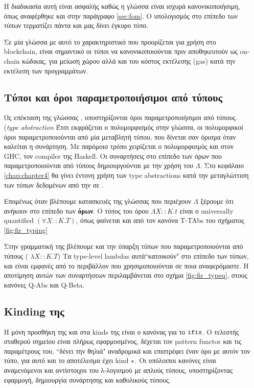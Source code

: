 Η διαδικασία αυτή είναι ασφαλής καθώς η γλώσσα \FOMF{} είναι ισχυρά κανονικοποιήσιμη, όπως αναφέρθηκε
και στην παράγραφο \ref{sec:fom}. Ο υπολογισμός στο επίπεδο των τύπων τερματίζει πάντα και μας δίνει
έγκυρο τύπο.

Σε μία γλώσσα με αυτό το χαρακτηριστικό που προορίζεται για χρήση στο blockchain, είναι σημαντικό
οι τύποι να κανονικοποιούνται πριν αποθηκευτούν ως on-chain κώδικας, για μείωση χώρου αλλά
και του κόστος εκτέλεσης (gas) κατά την εκτέλεση των προγραμμάτων.


\subsection{Τύποι και όροι παραμετροποιήσιμοι από τύπους}

Ως επέκταση της γλώσσας \FOM, υποστηρίζονται όροι παραμετροποιήσιμοι από τύπους.
(\emph{type abstraction}
Έτσι εκφράζεται ο πολυμορφισμός στην γλώσσα, οι πολυμορφικοί όροι παραμετροποιούνται
από μία μεταβλητή τύπου, που δίνεται σαν όρισμα όταν καλείται η συνάρτηση. Με παρόμοιο
τρόπο χειρίζεται ο πολυμορφισμός και στον GHC, τον compiler της Haskell. Οι συναρτήσεις
στο επίπεδο των όρων που παραμετροποιούνται από τύπους δημιουργούνται με την χρήση
του $\Lambda$. Στο κεφάλαιο \ref{chap:chapter4} θα γίνει έντονη χρήση των type abstractions
κατά την μεταγλώττιση των τύπων δεδομένων από την \FIR{} σε \FOMF{}.


Επομένως όταν
βλέπουμε κατασκευές της γλώσσας που περιέχουν $\Lambda$ ξέρουμε ότι ανήκουν
στο επίπεδο των \textbf{όρων}. Ο τύπος του όρου $ \Lambda X :: K . t $ είναι ο universally
quantified $(\forall X::K.T)$, όπως φαίνεται και από τον κανόνα T-TAbs του σχήματος \ref{fig:fir_typing}

Στην γραμματική της \FOMF{} βλέπουμε και την ύπαρξη τύπων που παραμετροποιούνται από
τύπους ( $\lambda X :: K. T)$ Τα type-level lambdas αυτά``κατοικούν" στο επίπεδο των τύπων,
και είναι εμφανές από το περιβάλλον που χρησιμοποιούνται σε ποια αναφερόμαστε. Η αποτίμηση
αυτών των συναρτήσεων περιλαμβάνεται στο σχήμα \ref{fig:fir_typeq}, στους κανόνες Q-Abs και
Q-Beta.




\subsection{Kinding της \FOMF{}}

Η μόνη προσθήκη της \FOMF{} και \FIR{} στα kinds της \FOM{} είναι ο κανόνας
για το $\operatorname{\texttt{ifix}}$. Ο τελεστής σταθερού σημείου είναι πλήρως εφαρμοσμένος, δέχεται
τον pattern functor και τις παραμέτρους  του, ``δένει την θηλιά" αναδρομικά και επιστρέφει
έναν όρο με αυτόν τον τύπο, για αυτό και το αποτέλεσμα έχει kind $\operatorname{\ast}$. Οι υπόλοιποι
κανόνες είναι αναμενόμενοι και αντίστοιχοι του λ-λογισμού με απλούς τύπους, υποστηρίζοντας
εφαρμογή, δημιουργία συνάρτησης και καθολικούς τύπους.

\vspace{1cm}